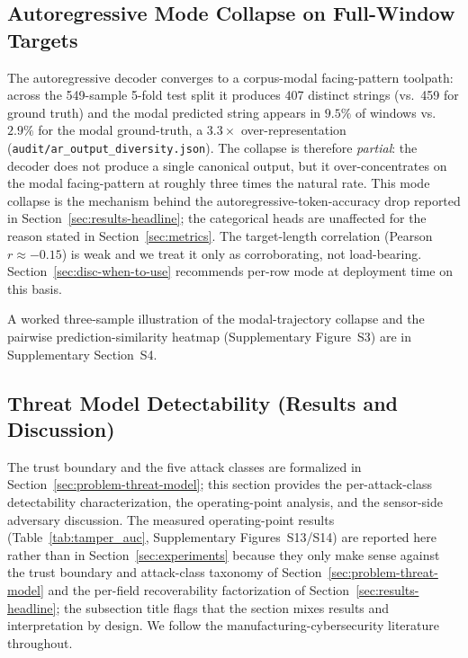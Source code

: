 \documentclass[sensors,article,submit,moreauthors,pdftex]{Definitions/mdpi}
\begin{document}
\subsection{Autoregressive Mode Collapse on Full-Window Targets}
\label{sec:disc-mode-collapse}

The autoregressive decoder converges to a corpus-modal facing-pattern toolpath: across the 549-sample 5-fold test split it produces 407 distinct strings (vs.\ 459 for ground truth) and the modal predicted string appears in $9.5\%$ of windows vs.\ $2.9\%$ for the modal ground-truth, a $3.3\times$ over-representation (\texttt{audit/ar\_output\_diversity.json}). The collapse is therefore \emph{partial}: the decoder does not produce a single canonical output, but it over-concentrates on the modal facing-pattern at roughly three times the natural rate. This mode collapse is the mechanism behind the autoregressive-token-accuracy drop reported in Section~\ref{sec:results-headline}; the categorical heads are unaffected for the reason stated in Section~\ref{sec:metrics}. The target-length correlation (Pearson $r \approx -0.15$) is weak and we treat it only as corroborating, not load-bearing. Section~\ref{sec:disc-when-to-use} recommends per-row mode at deployment time on this basis.

A worked three-sample illustration of the modal-trajectory collapse and the pairwise prediction-similarity heatmap (Supplementary Figure~S3) are in Supplementary Section~S4.


\subsection{Threat Model Detectability (Results and Discussion)}
\label{sec:disc-threat-model}

The trust boundary and the five attack classes are formalized in Section~\ref{sec:problem-threat-model}; this section provides the per-attack-class detectability characterization, the operating-point analysis, and the sensor-side adversary discussion. The measured operating-point results (Table~\ref{tab:tamper_auc}, Supplementary Figures~S13/S14) are reported here rather than in Section~\ref{sec:experiments} because they only make sense against the trust boundary and attack-class taxonomy of Section~\ref{sec:problem-threat-model} and the per-field recoverability factorization of Section~\ref{sec:results-headline}; the subsection title flags that the section mixes results and interpretation by design. We follow the manufacturing-cybersecurity literature~\cite{sturm2014cyber,yampolskiy2018security,kimmell2025cnc,zonouz2014plc,belikovetsky2017drowned,nist2023sp80082} throughout.
\end{document}

